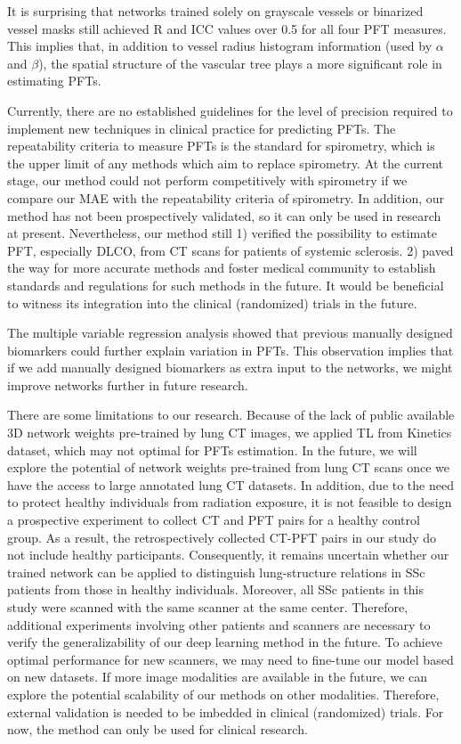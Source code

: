 It is surprising that networks trained solely on grayscale vessels or binarized vessel masks still achieved R and ICC values over 0.5 for all four PFT measures. This implies that, in addition to vessel radius histogram information (used by $\alpha$ and $\beta$), the spatial structure of the vascular tree plays a more significant role in estimating PFTs.

Currently, there are no established guidelines for the level of precision required to implement new techniques in clinical practice for predicting PFTs. The repeatability criteria to measure PFTs is the standard for spirometry, which is the upper limit of any methods which aim to replace spirometry. At the current stage, our method could not perform competitively with spirometry if we compare our MAE with the repeatability criteria of spirometry. In addition, our method has not been prospectively validated, so it can only be used in research at present. Nevertheless, our method still 1) verified the possibility to estimate PFT, especially DLCO, from CT scans for patients of systemic sclerosis. 2) paved the way for more accurate methods and foster medical community to establish standards and regulations for such methods in the future. It would be beneficial to witness its integration into the clinical (randomized) trials in the future.

The multiple variable regression analysis showed that previous manually designed biomarkers could further explain variation in PFTs. This observation implies that if we add manually designed biomarkers as extra input to the networks, we might improve networks further in future research.

There are some limitations to our research. Because of the lack of public available 3D network weights pre-trained by lung CT images, we applied TL from Kinetics dataset, which may not optimal for PFTs estimation. In the future, we will explore the potential of network weights pre-trained from lung CT scans once we have the access to large annotated lung CT datasets. In addition, due to the need to protect healthy individuals from radiation exposure, it is not feasible to design a prospective experiment to collect CT and PFT pairs for a healthy control group. As a result, the retrospectively collected CT-PFT pairs in our study do not include healthy participants. Consequently, it remains uncertain whether our trained network can be applied to distinguish lung-structure relations in SSc patients from those in healthy individuals. Moreover, all SSc patients in this study were scanned with the same scanner at the same center. Therefore, additional experiments involving other patients and scanners are necessary to verify the generalizability of our deep learning method in the future. To achieve optimal performance for new scanners, we may need to fine-tune our model based on new datasets. If more image modalities are available in the future, we can explore the potential scalability of our methods on other modalities. Therefore, external validation is needed to be imbedded in clinical (randomized) trials. For now, the method can only be used for clinical research.


